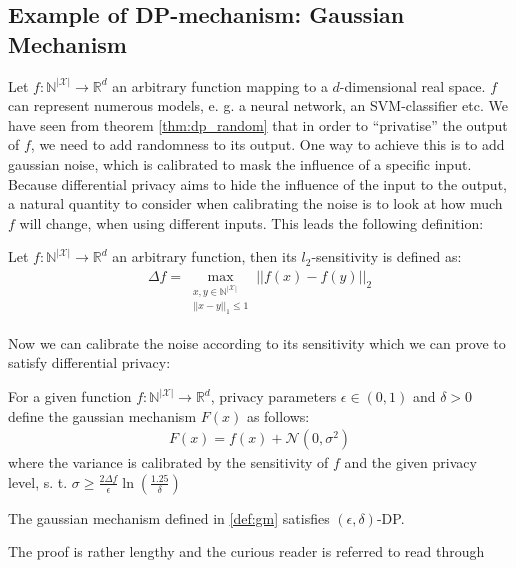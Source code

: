\subsection{Example of DP-mechanism: Gaussian Mechanism}

Let $f:\mathbb{N}^{|\mathcal{X}|} \longrightarrow \mathbb{R}^d$ an arbitrary function mapping to a $d$-dimensional real space. $f$ can represent numerous models, e. g. a neural network, an SVM-classifier etc. We have seen from theorem \cref*{thm:dp_random} that in order to ``privatise'' the output of $f$, we need to add randomness to its output. One way to achieve this is to add gaussian noise, which is calibrated to mask the influence of a specific input. Because differential privacy aims to hide the influence of the input to the output, a natural quantity to consider when calibrating the noise is to look at how much $f$ will change, when using different inputs. This leads the following definition:

\begin{definition}[$l_2$-sensitivity]
    Let $f:\mathbb{N}^{|\mathcal{X}|} \longrightarrow \mathbb{R}^d$ an arbitrary function, then its $l_2$-sensitivity is defined as:
    \begin{align}
        \Delta f = \max_{\substack{x,y \in \mathbb{N}^{|\mathcal{X}|} \\ ||x-y||_1\le 1}} ||f(x)-f(y)||_2 
    \end{align}
\end{definition}

Now we can calibrate the noise according to its sensitivity which we can prove to satisfy differential privacy:
\begin{definition}\label{def:gm} \label{def:gm}
    For a given function  $f:\mathbb{N}^{|\mathcal{X}|} \longrightarrow \mathbb{R}^d$, privacy parameters $\epsilon \in (0,1)$ and $\delta>0$ define the gaussian mechanism $F(x)$ as follows:
    \begin{align}
        F(x) = f(x) + \mathcal{N}(0, \sigma^2)
    \end{align}
    where the variance is calibrated by the sensitivity of $f$ and the given privacy level, s. t. $\sigma \ge \frac{2 \Delta f}{\epsilon}\ln(\frac{1.25}{\delta})$
\end{definition}

\begin{thm}
    The gaussian mechanism defined in \cref{def:gm} satisfies $(\epsilon, \delta)$-DP.
\end{thm}
The proof is rather lengthy and the curious reader is referred to read through \parencite[][Appendix A]{dwork2014algorithmic}